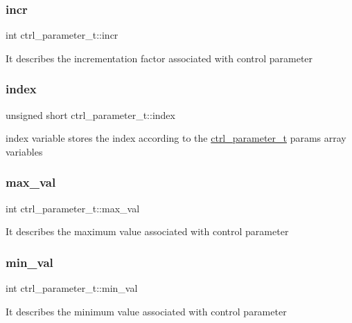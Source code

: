 \subsubsection{\texorpdfstring{incr}{incr}}
{\footnotesize\ttfamily int ctrl\+\_\+parameter\+\_\+t\+::incr}

It describes the incrementation factor associated with control parameter \mbox{\label{structctrl__parameter__t_a7e917570c0ce853f517de82df398872d}} 
\subsubsection{\texorpdfstring{index}{index}}
{\footnotesize\ttfamily unsigned short ctrl\+\_\+parameter\+\_\+t\+::index}

index variable stores the index according to the \hyperlink{structctrl__parameter__t}{ctrl\+\_\+parameter\+\_\+t} params array variables \mbox{\label{structctrl__parameter__t_ae727cbfc1947a7b682ee612fac91f2a3}} 
\subsubsection{\texorpdfstring{max\+\_\+val}{max\_val}}
{\footnotesize\ttfamily int ctrl\+\_\+parameter\+\_\+t\+::max\+\_\+val}

It describes the maximum value associated with control parameter \mbox{\label{structctrl__parameter__t_a5bea3ab520dfdf3c27f3f2baa81a4c36}} 
\subsubsection{\texorpdfstring{min\+\_\+val}{min\_val}}
{\footnotesize\ttfamily int ctrl\+\_\+parameter\+\_\+t\+::min\+\_\+val}

It describes the minimum value associated with control parameter \mbox{\label{structctrl__parameter__t_abf436e3e7d0aaff9ddeb0d28142bb7bb}} 
